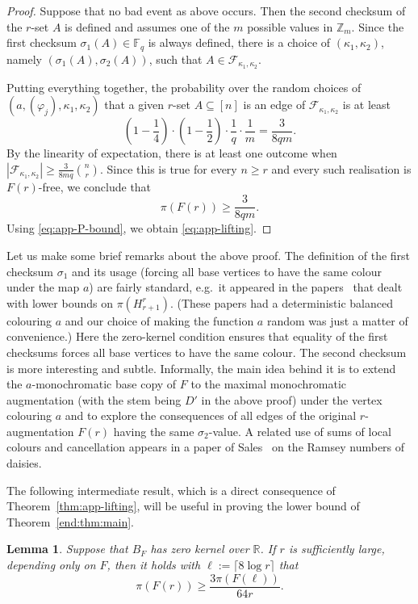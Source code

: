 \documentclass[12pt,a4paper]{article}
\numberwithin{equation}{section}
\newtheorem{lemma}[theorem]{Lemma}
\theoremstyle{definition}
\theoremstyle{remark}
\newcommand{\Z}[1]{\mathbb Z_{#1}}
\newcommand{\CSOne}{\sigma_1}
\newcommand{\CSTwo}{\sigma_2}
\newcommand{\F}[2]{\mathcal F_{#1,#2}}
\newcommand{\PP}{m}
\begin{document}
\begin{proof}
Suppose that no bad event as above occurs. Then the second checksum of the $r$-set $A$ is defined and assumes one of the $\PP$ possible values in $\Z{\PP}$. Since the first checksum $\CSOne(A)\in\mathbb F_q$ is always defined, there is a choice of $(\kappa_1,\kappa_2)$, namely $(\CSOne(A),\CSTwo(A))$, such that $A\in\F{\kappa_1}{\kappa_2}$.

Putting everything together, the probability over the random choices of $(a,(\varphi_j),\kappa_1,\kappa_2)$ that a given $r$-set $A\subseteq [n]$ is an edge of $\F{\kappa_1}{\kappa_2}$ is at least
\begin{equation*}
	\left(1-\frac14\right)\cdot\left(1-\frac1{2}\right)\cdot \frac1q\cdot \frac1{\PP}
 =\frac3{8q\PP}.
\end{equation*}
 By the linearity of expectation, there is at least one outcome when $|\F{\kappa_1}{\kappa_2}|\ge \frac3{8\PP q} \binom{n}{r}$. 
 Since this is true for every $n\ge r$ and every such realisation is $F(r)$-free, we conclude that
\[
 \pi(F(r))\ge\frac3{8q\PP}.
\]
Using \eqref{eq:app-P-bound}, we obtain \eqref{eq:app-lifting}.
\end{proof}


Let us make some brief remarks about the above proof.
The definition  of the first checksum $\CSOne$ and its usage (forcing all base vertices to have the same colour under the map $a$) are fairly standard, e.g.\ it appeared in the papers~\cite{KimRoush83,FranklRodl85gc,Sidorenko97} that dealt with lower bounds on $\pi(H_{r+1}^r)$. (These papers had a deterministic balanced colouring $a$ and our choice of making the function $a$ random was just a matter of convenience.) Here the zero-kernel condition ensures that equality of the first checksums forces all base vertices to have the same colour. 
The second checksum is more interesting and subtle. Informally, the main idea behind it is to extend the $a$-monochromatic base copy of $F$ to the maximal monochromatic augmentation (with the stem being $D'$ in the above proof) under the vertex colouring $a$ and to explore the consequences of all edges of the original $r$-augmentation $F(r)$ having the same $\CSTwo$-value. A related use of sums of local colours and cancellation appears in a paper of Sales~\cite{Sales24} on the Ramsey numbers of daisies.

The following intermediate result, which is a direct consequence of Theorem~\ref{thm:app-lifting}, will be useful in proving the  lower bound of Theorem~\ref{end:thm:main}.


\begin{lemma}\label{lem:app-one-step}
Suppose that $B_F$ has zero kernel over $\mathbb R$. If $r$ is sufficiently large, depending only on $F$, then it holds with $\ell:=\lceil8\log r\rceil$ that
\begin{equation}\label{eq:app-one-step}
 \pi(F(r))\ge\frac{3\pi(F(\ell))}{64r}.
\end{equation}
\end{lemma}
\end{document}

